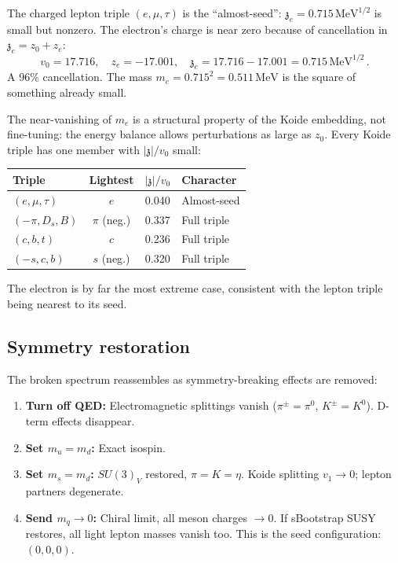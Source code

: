 \documentclass[12pt,a4paper]{article}
\newcommand{\MeV}{\,\text{MeV}}
\newcommand{\zch}{\mathfrak{z}}
\begin{document}
The charged lepton triple $(e, \mu, \tau)$ is the ``almost-seed'':
$\zch_e = 0.715\MeV^{1/2}$ is small but nonzero. The electron's
charge is near zero because of cancellation in $\zch_e = z_0 + z_e$:
\begin{equation}
v_0 = 17.716, \quad z_e = -17.001, \quad
\zch_e = 17.716 - 17.001 = 0.715\MeV^{1/2}\,.
\end{equation}
A 96\% cancellation. The mass $m_e = 0.715^2 = 0.511\MeV$ is the
square of something already small.

The near-vanishing of $m_e$ is a structural property of the Koide
embedding, not fine-tuning: the energy balance allows perturbations
as large as $z_0$. Every Koide triple has one member with
$|\zch|/v_0$ small:

\begin{center}
\begin{tabular}{lccl}
\toprule
Triple & Lightest & $|\zch|/v_0$ & Character \\
\midrule
$(e, \mu, \tau)$ & $e$ & 0.040 & Almost-seed \\
$(-\pi, D_s, B)$ & $\pi$ (neg.) & 0.337 & Full triple \\
$(c, b, t)$ & $c$ & 0.236 & Full triple \\
$(-s, c, b)$ & $s$ (neg.) & 0.320 & Full triple \\
\bottomrule
\end{tabular}
\end{center}

The electron is by far the most extreme case, consistent with the
lepton triple being nearest to its seed.

\subsection{Symmetry restoration}

The broken spectrum reassembles as symmetry-breaking effects are
removed:

\begin{enumerate}
\item \textbf{Turn off QED:} Electromagnetic splittings vanish
($\pi^\pm = \pi^0$, $K^\pm = K^0$). D-term effects disappear.
\item \textbf{Set $m_u = m_d$:} Exact isospin.
\item \textbf{Set $m_s = m_d$:} $SU(3)_V$ restored,
$\pi = K = \eta$. Koide splitting $v_1 \to 0$; lepton partners
degenerate.
\item \textbf{Send $m_q \to 0$:} Chiral limit, all meson charges
$\to 0$. If sBootstrap SUSY restores, all light lepton masses
vanish too. This is the seed configuration: $(0, 0, 0)$.
\end{enumerate}
\end{document}
